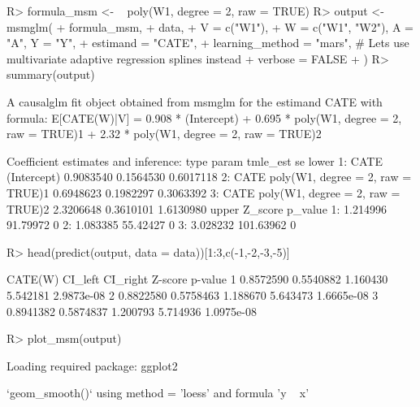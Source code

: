\documentclass[
]{jss}
\begin{document}
\begin{CodeChunk}
\begin{CodeInput}
R> formula_msm <- ~ poly(W1, degree = 2, raw = TRUE)  
R> output <- msmglm(
+       formula_msm, 
+       data,
+       V = c("W1"),
+       W = c("W1", "W2"), A = "A", Y = "Y",
+       estimand = "CATE", 
+       learning_method = "mars", # Lets use multivariate adaptive regression splines instead
+       verbose = FALSE
+       )
R> summary(output)
\end{CodeInput}
\begin{CodeOutput}
A causalglm fit object obtained from msmglm for the estimand CATE with formula: 
E[CATE(W)|V] = 0.908 * (Intercept) + 0.695 * poly(W1, degree = 2, raw = TRUE)1 + 2.32 * poly(W1, degree = 2, raw = TRUE)2

Coefficient estimates and inference:
   type                             param  tmle_est        se     lower
1: CATE                       (Intercept) 0.9083540 0.1564530 0.6017118
2: CATE poly(W1, degree = 2, raw = TRUE)1 0.6948623 0.1982297 0.3063392
3: CATE poly(W1, degree = 2, raw = TRUE)2 2.3206648 0.3610101 1.6130980
      upper   Z_score p_value
1: 1.214996  91.79972       0
2: 1.083385  55.42427       0
3: 3.028232 101.63962       0
\end{CodeOutput}
\begin{CodeInput}
R> head(predict(output, data = data))[1:3,c(-1,-2,-3,-5)]
\end{CodeInput}
\begin{CodeOutput}
    CATE(W)   CI_left CI_right  Z-score    p-value
1 0.8572590 0.5540882 1.160430 5.542181 2.9873e-08
2 0.8822580 0.5758463 1.188670 5.643473 1.6665e-08
3 0.8941382 0.5874837 1.200793 5.714936 1.0975e-08
\end{CodeOutput}
\begin{CodeInput}
R> plot_msm(output)
\end{CodeInput}
\begin{CodeOutput}
Loading required package: ggplot2
\end{CodeOutput}
\begin{CodeOutput}
`geom_smooth()` using method = 'loess' and formula 'y ~ x'
\end{CodeOutput}



\end{CodeChunk}
\end{document}
